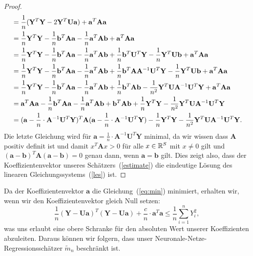 \begin{proof}
\begin{equation*}
\begin{split}
& = \frac{1}{n}(\mathbf{Y}^T\mathbf{Y} - 2\mathbf{Y}^T\mathbf{U}\mathbf{a}) + \mathbf{a}^T \mathbf{A} \mathbf{a} \\
& = \frac{1}{n}\mathbf{Y}^T\mathbf{Y} - \frac{1}{n}\mathbf{b}^T\mathbf{A}\mathbf{a} - \frac{1}{n}\mathbf{a}^T\mathbf{A}\mathbf{b} + \mathbf{a}^T\mathbf{A}\mathbf{a} \\
& = \frac{1}{n}\mathbf{Y}^T\mathbf{Y} - \frac{1}{n}\mathbf{b}^T\mathbf{A}\mathbf{a} - \frac{1}{n}\mathbf{a}^T\mathbf{A}\mathbf{b} + \frac{1}{n}\mathbf{b}^T\mathbf{U}^T\mathbf{Y} - \frac{1}{n}\mathbf{Y}^T\mathbf{U}\mathbf{b} + \mathbf{a}^T\mathbf{A}\mathbf{a} \\
& = \frac{1}{n}\mathbf{Y}^T\mathbf{Y} - \frac{1}{n}\mathbf{b}^T\mathbf{A}\mathbf{a} - \frac{1}{n}\mathbf{a}^T\mathbf{A}\mathbf{b} + \frac{1}{n}\mathbf{b}^T\mathbf{A}\mathbf{A}^{-1}\mathbf{U}^T\mathbf{Y} - \frac{1}{n}\mathbf{Y}^T\mathbf{U}\mathbf{b} + \mathbf{a}^T\mathbf{A}\mathbf{a} \\
& = \frac{1}{n}\mathbf{Y}^T\mathbf{Y} - \frac{1}{n}\mathbf{b}^T\mathbf{A}\mathbf{a} - \frac{1}{n}\mathbf{a}^T\mathbf{A}\mathbf{b} + \frac{1}{n}\mathbf{b}^T\mathbf{A}\mathbf{b} - \frac{1}{n^2}\mathbf{Y}^T\mathbf{U}\mathbf{A}^{-1}\mathbf{U}^T\mathbf{Y} + \mathbf{a}^T\mathbf{A}\mathbf{a} \\
& = \mathbf{a}^T\mathbf{A}\mathbf{a} - \frac{1}{n}\mathbf{b}^T\mathbf{A}\mathbf{a} - \frac{1}{n}\mathbf{a}^T\mathbf{A}\mathbf{b} + \mathbf{b}^T\mathbf{A}\mathbf{b} + \frac{1}{n}\mathbf{Y}^T\mathbf{Y} - \frac{1}{n^2}\mathbf{Y}^T\mathbf{U}\mathbf{A}^{-1}\mathbf{U}^T\mathbf{Y} \\
& = (\mathbf{a} - \frac{1}{n} \cdot \mathbf{A}^{-1}\mathbf{U}^T\mathbf{Y})^T \mathbf{A} (\mathbf{a} - \frac{1}{n} \cdot \mathbf{A}^{-1} \mathbf{U}^T\mathbf{Y}) - \frac{1}{n}\mathbf{Y}^T\mathbf{Y} - \frac{1}{n^2}\mathbf{Y}^T\mathbf{U}\mathbf{A}^{-1}\mathbf{U}^T\mathbf{Y}.
\end{split} 
\end{equation*} 
Die letzte Gleichung wird für $\mathbf{a} = \frac{1}{n} \cdot \mathbf{A}^{-1}\mathbf{U}^T\mathbf{Y}$ minimal, 
da wir wissen dass $\mathbf{A}$ positiv definit ist und damit $x^T\mathbf{A}x > 0$ für alle $x \in \mathbb{R}^S$ mit $x \neq 0$ gilt und $(\mathbf{a} - \mathbf{b})^T\mathbf{A}(\mathbf{a} - \mathbf{b}) = 0$ genau dann, wenn $\mathbf{a} = \mathbf{b}$ gilt.
Dies zeigt also, dass der Koeffizientenvektor unseres Schätzers~(\ref{estimate}) die eindeutige Lösung des linearen Gleichungssystems~(\ref{les}) ist.
\end{proof}
\begin{bemnumber}
\label{mtildebeschraenkt}
Da der Koeffizientenvektor $\mathbf{a}$ die Gleichung~(\ref{eq:min}) minimiert, erhalten wir, wenn wir den Koeffizientenvektor gleich Null setzen:
$$\frac{1}{n}(\mathbf{Y} - \mathbf{U}\mathbf{a})^T(\mathbf{Y} - \mathbf{U}\mathbf{a}) + \frac{c}{n} \cdot \mathbf{a}^T\mathbf{a} \leq \frac{1}{n} \sum_{i = 1}^n Y_i^2,$$
was uns erlaubt eine obere Schranke für den absoluten Wert unserer Koeffizienten abzuleiten. Daraus können wir folgern, dass unser Neuronale-Netze-Regressionsschätzer $\tilde{m}_n$ beschränkt ist. 
\end{bemnumber}